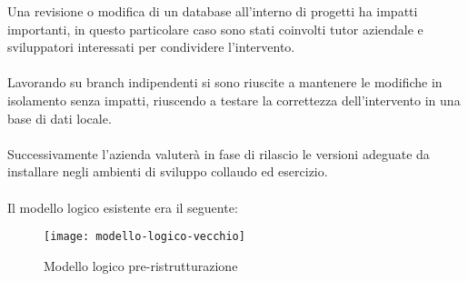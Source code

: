 Una revisione o modifica di un database all'interno di progetti ha impatti importanti, in questo
particolare caso sono stati coinvolti tutor aziendale e sviluppatori interessati per condividere
l'intervento. 
\\\\
Lavorando su branch indipendenti si sono riuscite a mantenere le modifiche 
in isolamento senza impatti, riuscendo a testare la correttezza dell'intervento in una base di dati locale.
\\\\
Successivamente l'azienda valuterà in fase di rilascio le versioni adeguate da installare
negli ambienti di sviluppo collaudo ed esercizio.
\\\\
Il modello logico esistente era il seguente:
\begin{figure}[H]
  \centering
  \texttt{[image: modello-logico-vecchio]}
  \caption{Modello logico pre-ristrutturazione}
\end{figure}

